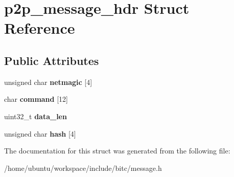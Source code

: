 \hypertarget{structp2p__message__hdr}{\section{p2p\-\_\-message\-\_\-hdr Struct Reference}
\label{structp2p__message__hdr}
}
\subsection*{Public Attributes}
\begin{DoxyCompactItemize}
\item 
\hypertarget{structp2p__message__hdr_a1317e983ad2ac08d2b9ee4bea02c3144}{unsigned char {\bfseries netmagic} \mbox{[}4\mbox{]}}\label{structp2p__message__hdr_a1317e983ad2ac08d2b9ee4bea02c3144}

\item 
\hypertarget{structp2p__message__hdr_af753c8431ed82fc57bc5c81433c7db05}{char {\bfseries command} \mbox{[}12\mbox{]}}\label{structp2p__message__hdr_af753c8431ed82fc57bc5c81433c7db05}

\item 
\hypertarget{structp2p__message__hdr_a8e718a951bb51f94a285cc5058d25be9}{uint32\-\_\-t {\bfseries data\-\_\-len}}\label{structp2p__message__hdr_a8e718a951bb51f94a285cc5058d25be9}

\item 
\hypertarget{structp2p__message__hdr_afc8675117c7e27161bb0f91a5d85fb53}{unsigned char {\bfseries hash} \mbox{[}4\mbox{]}}\label{structp2p__message__hdr_afc8675117c7e27161bb0f91a5d85fb53}

\end{DoxyCompactItemize}


The documentation for this struct was generated from the following file\-:\begin{DoxyCompactItemize}
\item 
/home/ubuntu/workspace/include/bitc/message.\-h\end{DoxyCompactItemize}
